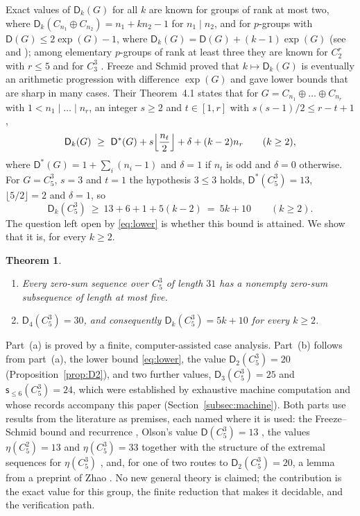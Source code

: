 \documentclass[11pt]{article}
\newtheorem{theorem}{Theorem}[section]
\theoremstyle{definition}
\theoremstyle{remark}
\newcommand{\Dk}{\mathsf{D}}
\newcommand{\Dstar}{\mathsf{D}^{*}}
\newcommand{\C}{C_5^{3}}
\newcommand{\sle}[1]{\mathsf{s}_{\le #1}}
\begin{document}
Exact values of $\Dk_k(G)$ for all $k$ are known for groups of rank at most two, where $\Dk_k(C_{n_1}\oplus C_{n_2})=n_1+kn_2-1$ for $n_1\mid n_2$, and for $p$-groups with $\Dk(G)\le2\exp(G)-1$, where $\Dk_k(G)=\Dk(G)+(k-1)\exp(G)$ (see \cite[Section~6.1]{GeroldingerHalterKoch2006} and \cite{DelormeOrdazQuiroz2001}); among elementary $p$-groups of rank at least three they are known for $C_2^r$ with $r\le5$ \cite{DelormeOrdazQuiroz2001,FreezeSchmid2010} and for $C_3^3$ \cite{BhowmikSchlagePuchta2007}. Freeze and Schmid \cite{FreezeSchmid2010} proved that $k\mapsto\Dk_k(G)$ is eventually an arithmetic progression with difference $\exp(G)$ and gave lower bounds that are sharp in many cases. Their Theorem~4.1 states that for $G=C_{n_1}\oplus\dots\oplus C_{n_r}$ with $1<n_1\mid\dots\mid n_r$, an integer $s\ge2$ and $t\in[1,r]$ with $s(s-1)/2\le r-t+1$,
\begin{equation}\label{eq:FS}
\Dk_k(G)\ \ge\ \Dstar(G)+s\Bigl\lfloor\frac{n_t}{2}\Bigr\rfloor+\delta+(k-2)n_r\qquad(k\ge2),
\end{equation}
where $\Dstar(G)=1+\sum_{i}(n_i-1)$ and $\delta=1$ if $n_t$ is odd and $\delta=0$ otherwise. For $G=\C$, $s=3$ and $t=1$ the hypothesis $3\le3$ holds, $\Dstar(\C)=13$, $\lfloor 5/2\rfloor=2$ and $\delta=1$, so
\begin{equation}\label{eq:lower}
\Dk_k(\C)\ \ge\ 13+6+1+5(k-2)\ =\ 5k+10\qquad(k\ge2).
\end{equation}
The question left open by \eqref{eq:lower} is whether this bound is attained. We show that it is, for every $k\ge2$.

\begin{theorem}\label{thm:main}
\leavevmode
\begin{enumerate}[label=\textup{(\alph*)},leftmargin=2em]
\item Every zero-sum sequence over $\C$ of length $31$ has a nonempty zero-sum subsequence of length at most five.
\item $\Dk_4(\C)=30$, and consequently $\Dk_k(\C)=5k+10$ for every $k\ge2$.
\end{enumerate}
\end{theorem}

Part~(a) is proved by a finite, computer-assisted case analysis. Part~(b) follows from part~(a), the lower bound \eqref{eq:lower}, the value $\Dk_2(\C)=20$ (Proposition~\ref{prop:D2}), and two further values, $\Dk_3(\C)=25$ and $\sle{6}(\C)=24$, which were established by exhaustive machine computation and whose records accompany this paper (Section~\ref{subsec:machine}). Both parts use results from the literature as premises, each named where it is used: the Freeze--Schmid bound and recurrence \cite{FreezeSchmid2010}, Olson's value $\Dk(\C)=13$ \cite{Olson1969}, the values $\eta(C_5^2)=13$ and $\eta(\C)=33$ together with the structure of the extremal sequences for $\eta(\C)$ \cite{GaoHouSchmidThangadurai2007,FanGaoWangZhongZhuang2012}, and, for one of two routes to $\Dk_2(\C)=20$, a lemma from a preprint of Zhao \cite{Zhao2025}. No new general theory is claimed; the contribution is the exact value for this group, the finite reduction that makes it decidable, and the verification path.
\end{document}
